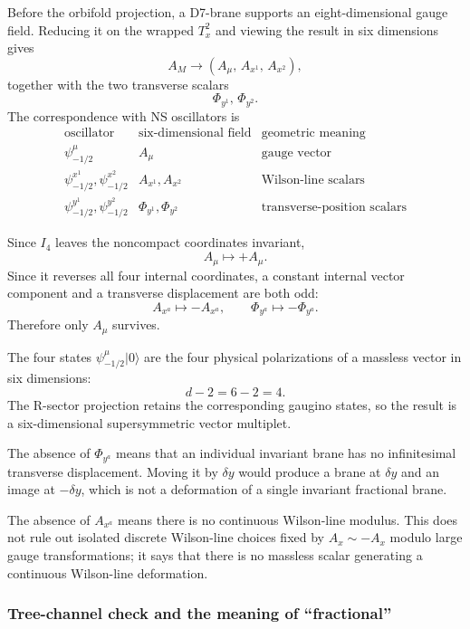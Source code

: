 \documentclass[
  10pt,
  a4paper,
  openany]{book}
\begin{document}
Before the orbifold projection, a D7-brane supports an eight-dimensional
gauge field. Reducing it on the wrapped \(T_x^2\) and viewing the result
in six dimensions gives \[
A_M
\longrightarrow
\left(
A_\mu,\,
A_{x^1},\,
A_{x^2}
\right),
\] together with the two transverse scalars \[
\Phi_{y^1},\,
\Phi_{y^2}.
\] The correspondence with NS oscillators is \[
\begin{array}{c|c|c}
\text{oscillator}
&\text{six-dimensional field}
&\text{geometric meaning}\\ \hline
\psi_{-1/2}^{\mu}
&A_\mu
&\text{gauge vector}\\
\psi_{-1/2}^{x^1},\psi_{-1/2}^{x^2}
&A_{x^1},A_{x^2}
&\text{Wilson-line scalars}\\
\psi_{-1/2}^{y^1},\psi_{-1/2}^{y^2}
&\Phi_{y^1},\Phi_{y^2}
&\text{transverse-position scalars}
\end{array}
\]

Since \(I_4\) leaves the noncompact coordinates invariant, \[
A_\mu\mapsto+A_\mu.
\] Since it reverses all four internal coordinates, a constant internal
vector component and a transverse displacement are both odd: \[
A_{x^a}\mapsto-A_{x^a},
\qquad
\Phi_{y^a}\mapsto-\Phi_{y^a}.
\] Therefore only \(A_\mu\) survives.

The four states \(\psi_{-1/2}^{\mu}|0\rangle\) are the four physical
polarizations of a massless vector in six dimensions: \[
d-2
=
6-2
=
4.
\] The R-sector projection retains the corresponding gaugino states, so
the result is a six-dimensional supersymmetric vector multiplet.

The absence of \(\Phi_{y^a}\) means that an individual invariant brane
has no infinitesimal transverse displacement. Moving it by \(\delta y\)
would produce a brane at \(\delta y\) and an image at \(-\delta y\),
which is not a deformation of a single invariant fractional brane.

The absence of \(A_{x^a}\) means there is no continuous Wilson-line
modulus. This does not rule out isolated discrete Wilson-line choices
fixed by \(A_x\sim-A_x\) modulo large gauge transformations; it says
that there is no massless scalar generating a continuous Wilson-line
deformation.

\subsubsection{Tree-channel check and the meaning of
``fractional''}\label{tree-channel-check-and-the-meaning-of-fractional}
\end{document}
